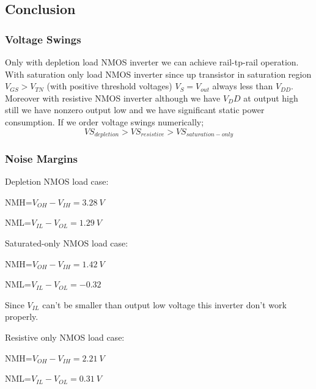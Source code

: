 \documentclass[11 pt]{article}
\begin{document}
\subsection*{Conclusion}
\subsubsection*{Voltage Swings}
Only with depletion load NMOS inverter we can achieve rail-tp-rail operation. With saturation only load NMOS inverter since up transistor in saturation region $V_{GS}>V_{TN}$
(with positive threshold voltages) $V_S=V_{out}$ always less than $V_{DD}$. Moreover with resistive NMOS inverter although we have $V_DD$ at output high still we have nonzero output low and we have significant static power consumption. If we order voltage swings numerically;
$$VS_{depletion}>VS_{resistive}>VS_{saturation-only}$$
\subsubsection*{Noise Margins}
Depletion NMOS load case:

NMH=$V_{OH}-V_{IH}=3.28 \> V $

NML=$V_{IL}-V_{OL}=1.29\> V $

Saturated-only NMOS load case:

NMH=$V_{OH}-V_{IH}= 1.42 \>V$

NML=$V_{IL}-V_{OL}= -0.32$

Since $V_{IL}$ can't be smaller than output low voltage this inverter don't work properly.

Resistive only NMOS load case:

NMH=$V_{OH}-V_{IH}= 2.21 \>V$

NML=$V_{IL}-V_{OL}= 0.31 \>V$
\end{document}
